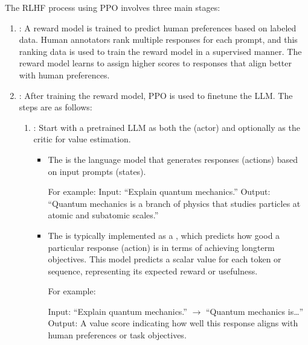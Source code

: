 \documentclass[letterpaper,11pt,english]{sphinxmanual}
\begin{document}
\sphinxAtStartPar
{}

\sphinxAtStartPar
The RLHF process using PPO involves three main stages:
\begin{enumerate}
%
\item {} 
\sphinxAtStartPar
{}: A reward model is trained to predict
human preferences based on labeled data. Human annotators rank
multiple responses for each prompt, and this ranking data is used to
train the reward model in a supervised manner. The reward model
learns to assign higher scores to responses that align better with
human preferences.

\item {} 
\sphinxAtStartPar
{}: After training the reward model,
PPO is used to fine\sphinxhyphen{}tune the LLM. The steps are as follows:
\begin{enumerate}
%
\item {} 
\sphinxAtStartPar
{}: Start with a pre\sphinxhyphen{}trained LLM as both the
 (actor) and optionally as the critic for value
estimation.
\begin{itemize}
\item {} 
\sphinxAtStartPar
The  is the language model that generates responses
(actions) based on input prompts (states).

\sphinxAtStartPar
For example: Input: “Explain quantum mechanics.” Output:
“Quantum mechanics is a branch of physics that studies particles
at atomic and subatomic scales.”

\item {} 
\sphinxAtStartPar
The  is typically implemented as a ,
which predicts how good a particular response (action) is in
terms of achieving long\sphinxhyphen{}term objectives. This model predicts a
scalar value for each token or sequence, representing its
expected reward or usefulness.

\sphinxAtStartPar
For example:

\sphinxAtStartPar
Input: “Explain quantum mechanics.” \(\rightarrow\) “Quantum mechanics is…”
Output: A value score indicating how well this response aligns
with human preferences or task objectives.


\end{itemize}
\end{enumerate}
\end{enumerate}
\end{document}
